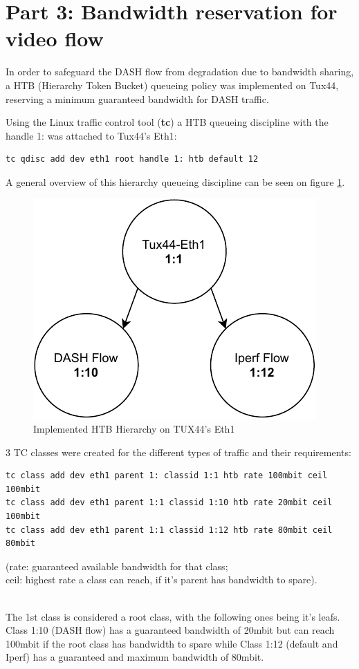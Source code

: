 \documentclass{article}
\begin{document}
\section*{Part 3: Bandwidth reservation for video flow} 

In order to safeguard the DASH flow from degradation due to bandwidth sharing,
a HTB (Hierarchy Token Bucket) queueing policy was implemented on Tux44, 
reserving a minimum guaranteed bandwidth for DASH traffic.

Using the Linux traffic control tool (\textbf{tc}) a HTB queueing discipline 
with the handle 1: was attached to Tux44's Eth1:
\begin{verbatim}
tc qdisc add dev eth1 root handle 1: htb default 12
\end{verbatim}

A general overview of this hierarchy queueing discipline can be seen on figure 
\ref{fig:HTBHierarchy}.

\begin{figure}[h]
    \centering
    \includegraphics[width=0.3\linewidth,keepaspectratio]{HTBHierarchy}
    \caption{Implemented HTB Hierarchy on TUX44's Eth1}
    \label{fig:HTBHierarchy}
\end{figure}
\FloatBarrier

3 TC classes were created for the different types of traffic and their 
requirements:
\begin{verbatim}
tc class add dev eth1 parent 1: classid 1:1 htb rate 100mbit ceil 100mbit 
tc class add dev eth1 parent 1:1 classid 1:10 htb rate 20mbit ceil 100mbit
tc class add dev eth1 parent 1:1 classid 1:12 htb rate 80mbit ceil 80mbit
\end{verbatim}
(rate: guaranteed available bandwidth for that class; 
~\\
ceil: highest rate a class can reach, if it's parent has bandwidth to 
spare).

~\\
The 1st class is considered a root class, with the following ones being it's 
leafs.
Class 1:10 (DASH flow) has a guaranteed bandwidth of 20mbit but can reach
100mbit if the root class has bandwidth to spare while 
Class 1:12 (default and Iperf) has a guaranteed and maximum bandwidth of 80mbit.
\end{document}
